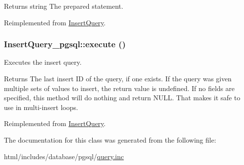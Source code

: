 \begin{DoxyReturn}{Returns}
string The prepared statement. 
\end{DoxyReturn}


Reimplemented from \hyperlink{classInsertQuery_a996fb0719632b8861284683c1ff711fa}{InsertQuery}.\hypertarget{classInsertQuery__pgsql_a554ec18b9f8003d0252fa754ab9217d3}{
\subsubsection[{execute}]{\setlength{\rightskip}{0pt plus 5cm}InsertQuery\_\-pgsql::execute ()}}
\label{classInsertQuery__pgsql_a554ec18b9f8003d0252fa754ab9217d3}
Executes the insert query.

\begin{DoxyReturn}{Returns}
The last insert ID of the query, if one exists. If the query was given multiple sets of values to insert, the return value is undefined. If no fields are specified, this method will do nothing and return NULL. That makes it safe to use in multi-\/insert loops. 
\end{DoxyReturn}


Reimplemented from \hyperlink{classInsertQuery_a9bcd2f989e2ae0173bd6f58b6ede12fc}{InsertQuery}.

The documentation for this class was generated from the following file:\begin{DoxyCompactItemize}
\item 
html/includes/database/pgsql/\hyperlink{pgsql_2query_8inc}{query.inc}\end{DoxyCompactItemize}
